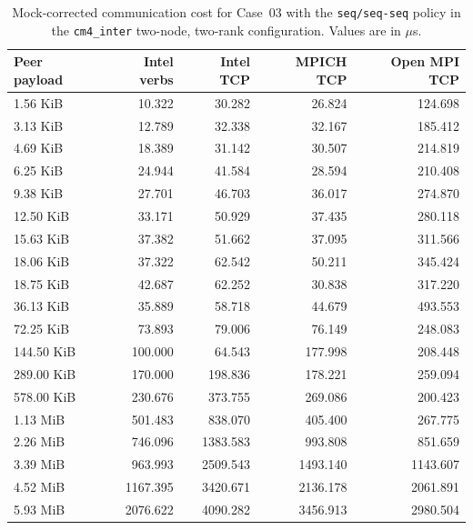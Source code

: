 \begin{table}[!htbp]
    \centering
    \scriptsize
    \caption[Two-rank Mock-corrected communication cost.]{Mock-corrected
        communication cost for Case~03 with the \texttt{seq/seq-seq}
        policy in the \texttt{cm4\_inter} two-node, two-rank configuration.
        Values are in $\mu$s.}
    \label{tab:cost-2n2r-cm4-inter}
    \begin{tabular}{lrrrr}
        \toprule
        Peer payload & Intel verbs & Intel TCP & MPICH TCP & Open MPI TCP \\
        \midrule
        1.56 KiB   & 10.322   & 30.282   & 26.824   & 124.698  \\
        3.13 KiB   & 12.789   & 32.338   & 32.167   & 185.412  \\
        4.69 KiB   & 18.389   & 31.142   & 30.507   & 214.819  \\
        6.25 KiB   & 24.944   & 41.584   & 28.594   & 210.408  \\
        9.38 KiB   & 27.701   & 46.703   & 36.017   & 274.870  \\
        12.50 KiB  & 33.171   & 50.929   & 37.435   & 280.118  \\
        15.63 KiB  & 37.382   & 51.662   & 37.095   & 311.566  \\
        18.06 KiB  & 37.322   & 62.542   & 50.211   & 345.424  \\
        18.75 KiB  & 42.687   & 62.252   & 30.838   & 317.220  \\
        36.13 KiB  & 35.889   & 58.718   & 44.679   & 493.553  \\
        72.25 KiB  & 73.893   & 79.006   & 76.149   & 248.083  \\
        144.50 KiB & 100.000  & 64.543   & 177.998  & 208.448  \\
        289.00 KiB & 170.000  & 198.836  & 178.221  & 259.094  \\
        578.00 KiB & 230.676  & 373.755  & 269.086  & 200.423  \\
        1.13 MiB   & 501.483  & 838.070  & 405.400 & 267.775  \\
        2.26 MiB   & 746.096  & 1383.583 & 993.808  & 851.659  \\
        3.39 MiB   & 963.993  & 2509.543 & 1493.140 & 1143.607 \\
        4.52 MiB   & 1167.395 & 3420.671 & 2136.178 & 2061.891 \\
        5.93 MiB   & 2076.622 & 4090.282 & 3456.913 & 2980.504 \\
        \bottomrule
    \end{tabular}
\end{table}


